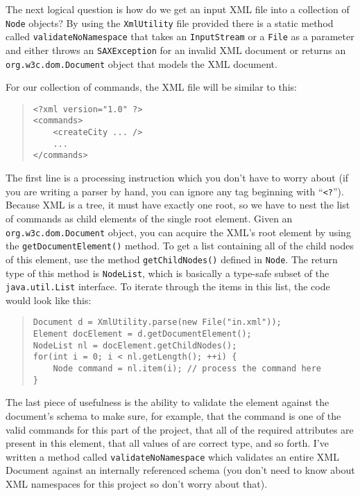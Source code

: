 \documentclass[12pt]{article}
\begin{document}
The next logical question is how do we get an input XML file into a
collection of \texttt{Node} objects? By using the \texttt{XmlUtility} file provided 
there is a static method called \texttt{validateNoNamespace} that takes 
an \texttt{InputStream} or a \texttt{File} as a parameter and either throws 
an \texttt{SAXException} for an invalid XML document or returns an 
\texttt{org.w3c.dom.Document} object that models the XML document.

For our collection of commands, the XML file will be similar to this:
\begin{quote}
\begin{verbatim}
<?xml version="1.0" ?>
<commands>
    <createCity ... />
    ...
</commands>
\end{verbatim}
\end{quote}

The first line is a processing instruction which you don't have to
worry about (if you are writing a parser by hand, you can ignore any
tag beginning with ``\texttt{<?}'').  Because XML is a tree, it must
have exactly one root, so we have to nest the list of commands as
child elements of the single root element.  Given an
\texttt{org.w3c.dom.Document} object, you can acquire the XML's root
element by using the \texttt{getDocumentElement()} method.  To get a
list containing all of the child nodes of this element, use the method
\texttt{getChildNodes()} defined in \texttt{Node}.  The return type of
this method is \texttt{NodeList}, which is basically a type-safe subset
of the \texttt{java.util.List} interface.  To iterate through the
items in this list, the code would look like this:
\begin{quote}
\begin{verbatim}
Document d = XmlUtility.parse(new File("in.xml"));
Element docElement = d.getDocumentElement();
NodeList nl = docElement.getChildNodes();
for(int i = 0; i < nl.getLength(); ++i) {
    Node command = nl.item(i); // process the command here
}
\end{verbatim}
\end{quote}

The last piece of usefulness is the ability to validate the element
against the document's schema to make sure, for example, that the command
is one of the valid commands for this part of the project, that all of
the required attributes are present in this element, that all values of are correct type, and so forth.
I've written a method called \texttt{validateNoNamespace} which
validates an entire XML Document against an internally referenced schema 
(you don't need to know about XML namespaces for this project so don't worry about that).  
\end{document}

